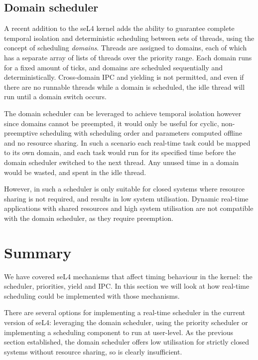 \subsection{Domain scheduler}

A recent addition to the seL4 kernel adds the ability to guarantee complete temporal isolation and deterministic scheduling between sets of threads, using the concept of scheduling \emph{domains}.
Threads are assigned to domains, each of which has a separate array of lists of threads over the priority range.
Each domain runs for a fixed amount of ticks, and domains are scheduled sequentially and deterministically.
Cross-domain \gls{IPC} and yielding is not permitted, and even if there are no runnable threads while a domain is scheduled, the idle thread will run until a domain switch occurs.

The domain scheduler can be leveraged to achieve temporal isolation however since domains cannot be preempted, it would only be useful for cyclic, non-preemptive scheduling with scheduling order and parameters computed offline and no resource sharing.
In such a scenario each real-time task could be mapped to its own domain, and each task would run for its specified time before the domain scheduler switched to the next thread.
Any unused time in a domain would be wasted, and spent in the idle thread.

However, in such a scheduler is only suitable for closed systems where resource sharing is not required, and results in low system utilisation.
Dynamic real-time applications with shared resources and high system utilisation are not compatible with the domain scheduler, as they require preemption.

\section{Summary}

We have covered seL4 mechanisms that affect timing behaviour in the kernel: the scheduler, priorities, yield and IPC. 
In this section we will look at how real-time scheduling could be implemented with those mechanisms.

There are several options for implementing a real-time scheduler in the current version of seL4: leveraging the domain scheduler, using the priority scheduler or implementing a scheduling component to run at user-level. 
As the previous section established, the domain scheduler offers low utilisation for strictly closed systems without resource sharing, so is clearly insufficient.

